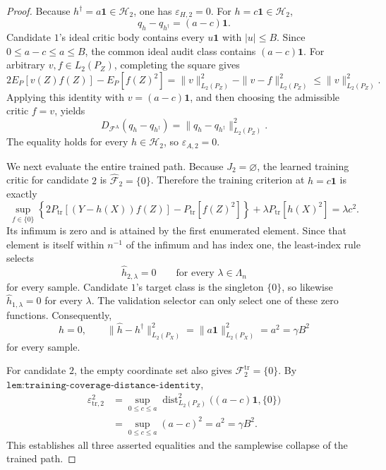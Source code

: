 \begin{proof}
Because \(h^\dagger=a\mathbf 1\in\mathcal H_2\), one has \(\varepsilon_{H,2}=0\). For \(h=c\mathbf 1\in\mathcal H_2\),
\[
 q_h-q_{h^\dagger}=(a-c)\mathbf 1.
\]
Candidate \(1\)'s ideal critic body contains every \(u\mathbf 1\) with \(|u|\le B\). Since \(0\le a-c\le a\le B\), the common ideal audit class contains \((a-c)\mathbf 1\). For arbitrary \(v,f\in L_2(P_Z)\), completing the square gives
\[
 2E_P[v(Z)f(Z)]-E_P[f(Z)^2]
 =\|v\|_{L_2(P_Z)}^2-\|v-f\|_{L_2(P_Z)}^2
 \le \|v\|_{L_2(P_Z)}^2.
\]
Applying this identity with \(v=(a-c)\mathbf 1\), and then choosing the admissible critic \(f=v\), yields
\[
 D_{\mathcal F^{\mathrm A}}(q_h-q_{h^\dagger})
 =\|q_h-q_{h^\dagger}\|_{L_2(P_Z)}^2.
\]
The equality holds for every \(h\in\mathcal H_2\), so \(\varepsilon_{A,2}=0\).

We next evaluate the entire trained path. Because \(J_2=\varnothing\), the learned training critic for candidate \(2\) is \(\widehat{\mathcal F}_2=\{0\}\). Therefore the training criterion at \(h=c\mathbf 1\) is exactly
\[
 \sup_{f\in\{0\}}
 \left\{2P_{\mathrm{tr}}[(Y-h(X))f(Z)]-P_{\mathrm{tr}}[f(Z)^2]\right\}
 +\lambda P_{\mathrm{tr}}[h(X)^2]
 =\lambda c^2.
\]
Its infimum is zero and is attained by the first enumerated element. Since that element is itself within \(n^{-1}\) of the infimum and has index one, the least-index rule selects
\[
 \widehat h_{2,\lambda}=0
 \qquad\text{for every }\lambda\in\Lambda_n
\]
for every sample. Candidate \(1\)'s target class is the singleton \(\{0\}\), so likewise \(\widehat h_{1,\lambda}=0\) for every \(\lambda\). The validation selector can only select one of these zero functions. Consequently,
\[
 \widehat h=0,
 \qquad
 \|\widehat h-h^\dagger\|_{L_2(P_X)}^2
 =\|a\mathbf 1\|_{L_2(P_X)}^2
 =a^2
 =\gamma B^2
\]
for every sample.

For candidate \(2\), the empty coordinate set also gives \(\mathcal F_2^{\mathrm{tr}}=\{0\}\). By \(\texttt{lem:training-coverage-distance-identity}\),
\[
 \begin{aligned}
 \varepsilon_{\mathrm{tr},2}^2
 &=\sup_{0\le c\le a}
   \operatorname{dist}_{L_2(P_Z)}^2
   \bigl((a-c)\mathbf 1,\{0\}\bigr)\\
 &=\sup_{0\le c\le a}(a-c)^2
 =a^2
 =\gamma B^2.
 \end{aligned}
\]
This establishes all three asserted equalities and the samplewise collapse of the trained path.


\end{proof}

